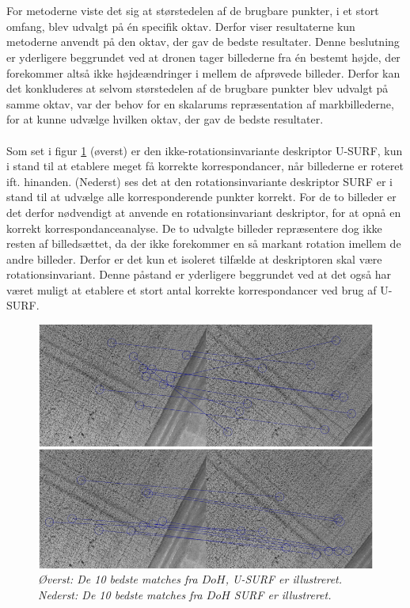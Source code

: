 \\ \\
For metoderne viste det sig at størstedelen af de brugbare punkter, i et stort omfang, blev udvalgt på én specifik oktav. Derfor viser resultaterne kun metoderne anvendt på den oktav, der gav de bedste resultater. Denne beslutning er yderligere beggrundet ved at dronen tager billederne fra én bestemt højde, der forekommer altså ikke højdeændringer i mellem de afprøvede billeder. Derfor kan det konkluderes at selvom størstedelen af de brugbare punkter blev udvalgt på samme oktav, var der behov for en skalarums repræsentation af markbillederne, for at kunne udvælge hvilken oktav, der gav de bedste resultater.
\\ \\
Som set i figur \ref{fig:rota} (øverst) er den ikke-rotationsinvariante deskriptor U-SURF, kun i stand til at etablere meget få korrekte korrespondancer, når billederne er roteret ift. hinanden. (Nederst) ses det at den rotationsinvariante deskriptor SURF er i stand til at udvælge alle korresponderende punkter korrekt. For de to billeder er det derfor nødvendigt at anvende en rotationsinvariant deskriptor, for at opnå en korrekt korrespondanceanalyse. De to udvalgte billeder repræsentere dog ikke resten af billedsættet, da der ikke forekommer en så markant rotation imellem de andre billeder. Derfor er det kun et isoleret tilfælde at deskriptoren skal være rotationsinvariant. Denne påstand er yderligere beggrundet ved at det også har været muligt at etablere et stort antal korrekte korrespondancer ved brug af U-
SURF.
\begin{figure}[H]
    \centering
    \includegraphics[width=1\textwidth]{fig/rot2.png}
     \vspace{-1em}
    \begin{center} 
       \caption{{\footnotesize \textit{Øverst: De 10 bedste matches fra $DoH$, U-SURF er illustreret. Nederst: De 10 bedste matches fra $DoH$ SURF er illustreret. }}}
    \label{fig:rota}
     \end{center}
     \vspace{-2.5em}
  \end{figure} \noindent

